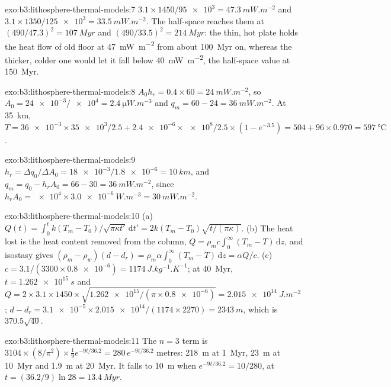 \begin{solution}{exo:b3:lithosphere-thermal-models:7}
$3.1\times1450/\num{95e3} = \qty{47.3}{mW.m^{-2}}$ and $3.1\times1350/\num{125e3}
= \qty{33.5}{mW.m^{-2}}$. The half-space reaches them at $(490/47.3)^2 =
\qty{107}{Myr}$ and $(490/33.5)^2 = \qty{214}{Myr}$: the thin, hot plate holds
the heat flow of old floor at \qty{47}{mW.m^{-2}} from about \qty{100}{Myr}
on, whereas the thicker, colder one would let it fall below
\qty{40}{mW.m^{-2}}, the half-space value at \qty{150}{Myr}.
\end{solution}

\begin{solution}{exo:b3:lithosphere-thermal-models:8}
$A_0h_r = 0.4\times60 = \qty{24}{mW.m^{-2}}$, so $A_0 =
\num{24e-3}/\num{e4} = \qty{2.4}{\micro W.m^{-3}}$ and $q_m = 60 - 24 =
\qty{36}{mW.m^{-2}}$. At \qty{35}{km}, $T = \num{36e-3}\times\num{35e3}/2.5 +
\num{2.4e-6}\times\num{e8}/2.5\times(1 - e^{-3.5}) = 504 + 96\times0.970 =
\qty{597}{\celsius}$.
\end{solution}

\begin{solution}{exo:b3:lithosphere-thermal-models:9}
$h_r = \Delta q_0/\Delta A_0 = \num{18e-3}/\num{1.8e-6} = \qty{10}{km}$, and
$q_m = q_0 - h_rA_0 = 66 - 30 = \qty{36}{mW.m^{-2}}$, since $h_rA_0 =
\num{e4}\times\qty{3.0e-6}{W.m^{-3}} = \qty{30}{mW.m^{-2}}$.
\end{solution}

\begin{solution}{exo:b3:lithosphere-thermal-models:10}
(a) $Q(t) = \int_0^tk(T_m - T_0)/\sqrt{\pi\kappa t'}\,\mathrm dt' =
2k(T_m - T_0)\sqrt{t/(\pi\kappa)}$. (b) The heat lost is the heat content
removed from the column, $Q = \rho_mc\int_0^\infty(T_m - T)\,\mathrm dz$, and
isostasy gives $(\rho_m - \rho_w)(d - d_r) = \rho_m\alpha\int_0^\infty(T_m -
T)\,\mathrm dz = \alpha Q/c$. (c) $c = 3.1/(3300\times\num{0.8e-6}) =
\qty{1174}{J.kg^{-1}.K^{-1}}$; at \qty{40}{Myr}, $t = \qty{1.262e15}{s}$ and
$Q = 2\times3.1\times1450\times\sqrt{\num{1.262e15}/(\pi\times\num{0.8e-6})} =
\qty{2.015e14}{J.m^{-2}}$; $d - d_r = \num{3.1e-5}\times\num{2.015e14}/
(1174\times2270) = \qty{2343}{m}$, which is $370.5\sqrt{40}$.
\end{solution}

\begin{solution}{exo:b3:lithosphere-thermal-models:11}
The $n = 3$ term is $3104\times(8/\pi^2)\times\tfrac19e^{-9t/36.2} =
280\,e^{-9t/36.2}$ metres: \qty{218}{m} at \qty{1}{Myr}, \qty{23}{m} at
\qty{10}{Myr} and \qty{1.9}{m} at \qty{20}{Myr}. It falls to \qty{10}{m} when
$e^{-9t/36.2} = 10/280$, at $t = (36.2/9)\ln28 = \qty{13.4}{Myr}$.
\end{solution}

